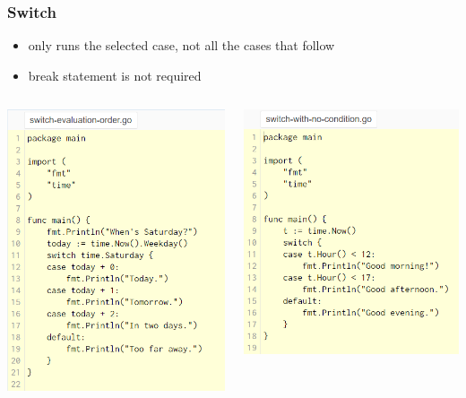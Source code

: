 \documentclass[14pt]{beamer}
\begin{document}
{
\begin{frame}
    \frametitle{Switch}
    \begin{itemize}
        \item only runs the selected case, not all the cases that follow
        \item break statement is not required
    \end{itemize}
    \begin{columns}
        \begin{column}{0.5\textwidth}
            \includegraphics[width=0.75\linewidth]{img/switch1.PNG}
        \end{column}
        \begin{column}{0.5\textwidth}
            \includegraphics[width=0.8\linewidth]{img/switch2.PNG}
        \end{column}
    \end{columns}
\end{frame}
}
\end{document}
